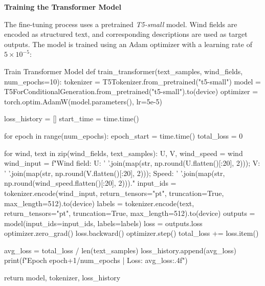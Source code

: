 {\bf Training the Transformer Model}

The fine-tuning process uses a pretrained \emph{T5-small} model. Wind fields are encoded as structured text, and corresponding descriptions are used as target outputs. The model is trained using an Adam optimizer with a learning rate of \(5 \times 10^{-5}\):

\begin{codeonly}{Train Transformer Model}
def train_transformer(text_samples, wind_fields, num_epochs=10):
    tokenizer = T5Tokenizer.from_pretrained("t5-small")
    model = T5ForConditionalGeneration.from_pretrained("t5-small").to(device)
    optimizer = torch.optim.AdamW(model.parameters(), lr=5e-5)
    
    loss_history = []
    start_time = time.time()

    for epoch in range(num_epochs):
        epoch_start = time.time()
        total_loss = 0
        
        for wind, text in zip(wind_fields, text_samples):
            U, V, wind_speed = wind
            wind_input = f"Wind field: U: {' '.join(map(str, np.round(U.flatten()[:20], 2)))}; V: {' '.join(map(str, np.round(V.flatten()[:20], 2)))}; Speed: {' '.join(map(str, np.round(wind_speed.flatten()[:20], 2)))}."
            input_ids = tokenizer.encode(wind_input, return_tensors="pt", truncation=True, max_length=512).to(device)
            labels = tokenizer.encode(text, return_tensors="pt", truncation=True, max_length=512).to(device)
            outputs = model(input_ids=input_ids, labels=labels)
            loss = outputs.loss
            optimizer.zero_grad()
            loss.backward()
            optimizer.step()
            total_loss += loss.item()
        
        avg_loss = total_loss / len(text_samples)
        loss_history.append(avg_loss)
        print(f"Epoch {epoch+1}/{num_epochs} | Loss: {avg_loss:.4f}")
    
    return model, tokenizer, loss_history
\end{codeonly}

